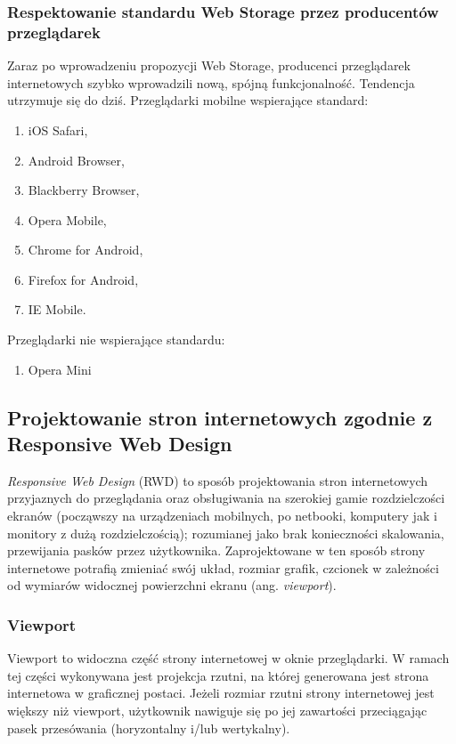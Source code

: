 \subsubsection{Respektowanie standardu Web Storage przez producentów przeglądarek}

Zaraz po wprowadzeniu propozycji Web Storage, producenci przeglądarek internetowych szybko wprowadzili nową, spójną funkcjonalność. Tendencja utrzymuje się do dziś. Przeglądarki mobilne wspierające standard\cite{caniuse-webstorage}:

\begin{enumerate}
  \item iOS Safari,
  \item Android Browser,
  \item Blackberry Browser,
  \item Opera Mobile,
  \item Chrome for Android,
  \item Firefox for Android,
  \item IE Mobile.
\end{enumerate}

Przeglądarki nie wspierające standardu:

\begin{enumerate}
  \item Opera Mini
\end{enumerate}

\subsection{Projektowanie stron internetowych zgodnie z Responsive Web Design}
\label{subsubsec:rwd}

\emph{Responsive Web Design} (RWD) to sposób projektowania stron internetowych przyjaznych do przeglądania oraz obsługiwania na szerokiej gamie rozdzielczości ekranów (począwszy na urządzeniach mobilnych, po netbooki, komputery jak i monitory z dużą rozdzielczością)\cite{rwd}; rozumianej jako brak konieczności skalowania, przewijania pasków przez użytkownika. Zaprojektowane w ten sposób strony internetowe potrafią zmieniać swój układ, rozmiar grafik, czcionek w zależności od wymiarów widocznej powierzchni ekranu (ang. \emph{viewport}).

\subsubsection{Viewport}

Viewport to widoczna część strony internetowej w oknie przeglądarki. W ramach tej części wykonywana jest projekcja rzutni, na której generowana jest strona internetowa w graficznej postaci. Jeżeli rozmiar rzutni strony internetowej jest większy niż viewport, użytkownik nawiguje się po jej zawartości przeciągając pasek przesówania (horyzontalny i/lub wertykalny).

